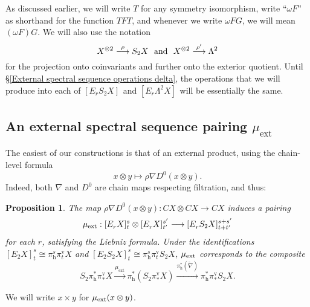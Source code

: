 \documentclass[11pt]{amsart} \renewcommand{\baselinestretch}{1.2}
\theoremstyle{plain}
\newtheorem{prop}[thm]{Proposition}
\theoremstyle{definition}
\renewcommand{\to}{\longrightarrow}
\newcommand{\scrC}{\mathscr{C}}
\newcommand{\ExtCohProd}{\mu_\mathrm{ext}}
\newcommand{\twist}{\omega}
\newcommand{\Nabla}{\nabla}
\newcommand{\algs}{{\scrC\!\textit{om}}}
\newcommand{\E}[5]{[E^{#1}_{#2}#3]^{#4}_{#5}}
\newcommand{\Edownup}[5]{[E_{#1}^{#2}#3]^{#4}_{#5}}
\newcommand{\uver}{^\mathrm{v}}
\newcommand{\dhor}{_\mathrm{h}}
\renewcommand{\mapsto}{\longmapsto}
\begin{document}
\begin{second quadrant homotopy sseq operations}
As discussed earlier, we will write $T$ for any symmetry isomorphism, write ``$\twist F$'' as shorthand for the function $TFT$, and  whenever we write $\twist FG$, we will mean $(\twist F)G$. We will also use the notation
\[X^{\otimes2}\overset{\rho}{\to}S_2X\textup{\ \ and\ \ }X^{\otimes2}\overset{\rho'}{\to}\Lambda^2
\]
for the projection onto coinvariants and further onto the exterior quotient. Until \S\ref{External spectral sequence operations delta}, the operations that we will produce into each of $\Edownup{r}{}{S_2X}{}{}$ and $\Edownup{r}{}{\Lambda^2X}{}{}$ will be essentially the same.
\subsection{An external spectral sequence pairing $\mu_\mathrm{ext}$}
The easiest of our constructions is that of an external product, using 
the chain-level formula
\[x\otimes y\mapsto\rho\Nabla D^0(x\otimes y).\]
Indeed, both $\Nabla$ and $D^0$ are chain maps respecting filtration, and thus:
\begin{prop}
\label{prop on basic product}
The map $\rho\Nabla D^0(x\otimes y):CX\otimes CX\to CX$ induces a pairing
\[\mu_\textup{ext}:\Edownup{r}{}{X}{s}{t}\otimes \Edownup{r}{}{X}{s'}{t'}\to \Edownup{r}{}{S_2X}{s+s'}{t+t'}\]
for each $r$, satisfying the Liebniz formula. Under the identifications $\Edownup{2}{}{X}{s}{t}\cong \pi\dhor^s\pi\uver_t X$ and $\Edownup{2}{}{S_2X}{s}{t}\cong \pi\dhor^s\pi\uver_t S_2X$, $\mu_\textup{ext}$ corresponds to the composite
\[S_2\pi\dhor^*\pi\uver_* X
\overset{\ExtCohProd}{\to} 
\pi\dhor^*(S_2\pi\uver_* X)
\overset{\pi\dhor^{*}(\widetilde{\nabla})}{\to}
\pi\dhor^{*}\pi\uver_{*}S_2 X.\]
\end{prop}
\noindent We will write $x\times y$ for $\mu_\textup{ext}(x\otimes y)$.
%

\end{second quadrant homotopy sseq operations}
\end{document}
